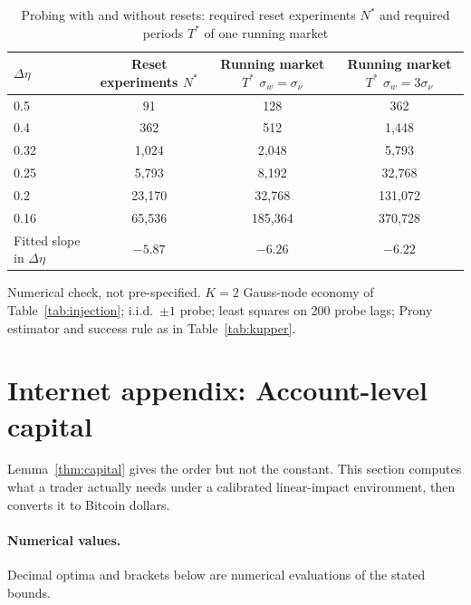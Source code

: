 \documentclass[12pt]{article}
\theoremstyle{definition}
\theoremstyle{remark}
\begin{document}
\begin{table}[!htbp]\centering\small
\begin{threeparttable}
\caption{Probing with and without resets: required reset experiments $N^*$ and required periods $T^*$ of one running market}\label{tab:running}
\begin{tabular}{lccc}
\toprule
$\Delta\eta$ & Reset experiments $N^*$ & \shortstack{Running market $T^*$\\ $\sigma_w=\sigma_\nu$} & \shortstack{Running market $T^*$\\ $\sigma_w=3\sigma_\nu$}\\
\midrule
0.5 & 91 & 128 & 362\\
0.4 & 362 & 512 & 1{,}448\\
0.32 & 1{,}024 & 2{,}048 & 5{,}793\\
0.25 & 5{,}793 & 8{,}192 & 32{,}768\\
0.2 & 23{,}170 & 32{,}768 & 131{,}072\\
0.16 & 65{,}536 & 185{,}364 & 370{,}728\\
\midrule
Fitted slope in $\Delta\eta$ & $-5.87$ & $-6.26$ & $-6.22$\\
\bottomrule
\end{tabular}
\begin{tablenotes}\footnotesize\item Numerical check, not pre-specified. $K=2$ Gauss-node economy of Table~\ref{tab:injection}; i.i.d.\ $\pm1$ probe; least squares on 200 probe lags; Prony estimator and success rule as in Table~\ref{tab:kupper}.\end{tablenotes}
\end{threeparttable}
\end{table}

\section{Internet appendix: Account-level capital}\label{sec:account}

Lemma~\ref{thm:capital} gives the order but not the constant. This section computes what a trader actually needs under a calibrated linear-impact environment, then converts it to Bitcoin dollars.

\paragraph{Numerical values.} Decimal optima and brackets below are numerical evaluations of the stated bounds.
\end{document}
